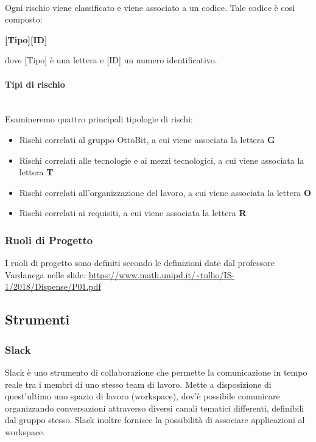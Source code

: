 \documentclass[11pt,a4paper]{article}
\begin{document}
\noindent \\
 Ogni rischio viene classificato e viene associato a un codice. Tale codice è così composto:
\begin{center}
	\textbf{[Tipo][ID]}
\end{center}
dove [Tipo] è una lettera e [ID] un numero identificativo.\\

\paragraph{Tipi di rischio} 
\noindent \\
 Esamineremo quattro principali tipologie di rischi:

\begin{itemize}
	\item Rischi correlati al gruppo OttoBit, a cui viene associata la lettera \textbf{G}
	\item Rischi correlati alle tecnologie e ai mezzi tecnologici, a cui viene associata la lettera \textbf{T}
	\item Rischi correlati all'organizzazione del lavoro, a cui viene associata la lettera \textbf{O}
	\item Rischi correlati ai requisiti, a cui viene associata la lettera \textbf{R}
\end{itemize}

\subsubsection{Ruoli di Progetto}
I ruoli di progetto sono definiti secondo le definizioni date dal professore Vardanega nelle slide:
\url{https://www.math.unipd.it/~tullio/IS-1/2018/Dispense/P01.pdf}

\newpage

\subsection{Strumenti}

\subsubsection{Slack}
Slack è uno strumento di collaborazione che permette la comunicazione in tempo reale tra i membri di uno stesso team di lavoro. Mette a disposizione di quest’ultimo uno spazio di lavoro (workspace), dov'è possibile comunicare organizzando conversazioni attraverso diversi canali tematici differenti, definibili dal gruppo stesso.
Slack inoltre fornisce la possibilità di associare applicazioni al workspace.
\end{document}
